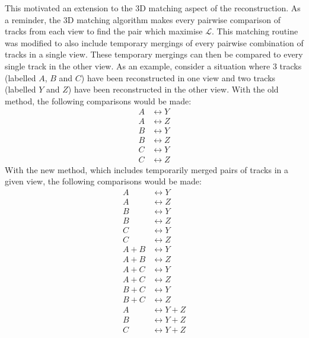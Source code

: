 \newline
\newline
This motivated an extension to the 3D matching aspect of the reconstruction.  As a reminder, the 3D matching algorithm makes every pairwise comparison of tracks from each view to find the pair which maximise $\mathcal{L}$.  This matching routine was modified to also include temporary mergings of every pairwise combination of tracks in a single view.  These temporary mergings can then be compared to every single track in the other view.  As an example, consider a situation where 3 tracks (labelled $A$, $B$ and $C$) have been reconstructed in one view and two tracks (labelled $Y$ and $Z$) have been reconstructed in the other view.  With the old method, the following comparisons would be made:
\begin{equation}
\begin{split}
A &\longleftrightarrow Y \\
A &\longleftrightarrow Z \\
B &\longleftrightarrow Y \\
B &\longleftrightarrow Z \\
C &\longleftrightarrow Y \\
C &\longleftrightarrow Z
\end{split}
\label{eq:TrackSplittingOldMethod}
\end{equation}
With the new method, which includes temporarily merged pairs of tracks in a given view, the following comparisons would be made:
\begin{equation}
\begin{split}
A &\longleftrightarrow Y \\
A &\longleftrightarrow Z \\
B &\longleftrightarrow Y \\
B &\longleftrightarrow Z \\
C &\longleftrightarrow Y \\
C &\longleftrightarrow Z \\
A+B &\longleftrightarrow Y \\
A+B &\longleftrightarrow Z \\
A+C &\longleftrightarrow Y \\
A+C &\longleftrightarrow Z \\
B+C &\longleftrightarrow Y \\
B+C &\longleftrightarrow Z \\
A &\longleftrightarrow Y+Z \\
B &\longleftrightarrow Y+Z \\
C &\longleftrightarrow Y+Z
\end{split}
\label{eq:TrackSplittingNewMethod}
\end{equation}
